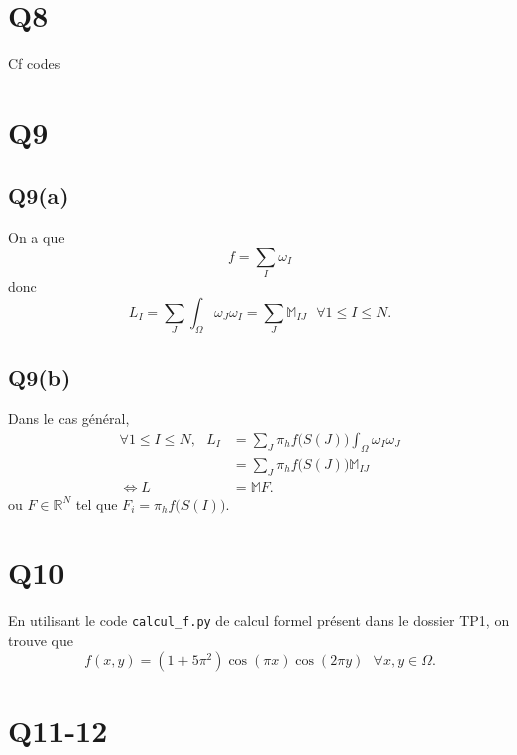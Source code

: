\documentclass[11pt]{article}
\newcommand{\R}{\mathbb{R}}
\newcommand{\M}{\mathbb{M}}
\newcommand{\ms}{~~~}
\begin{document}
\section{Q8}

Cf codes

\section{Q9}
\subsection{Q9(a)}
On a que
\begin{equation}
  f = \sum_I \omega_I
\end{equation}
donc
\begin{equation}
  L_I = \sum_J \int_\Omega \omega_J \omega_I = \sum_J \M_{IJ} \ms \forall 1 \leq I \leq N. 
\end{equation}

\subsection{Q9(b)}

Dans le cas général,
\begin{align}
  \forall 1 \leq I \leq N, \ms L_I
  &= \sum_J \pi_h f\big(S(J)\big) \int_\Omega \omega_I \omega_J \\
  &= \sum_J \pi_h f\big(S(J)\big) \M_{IJ} \\
  \Leftrightarrow
  L &= \M F.
\end{align}
ou $F\in\R^{ N}$ tel que $F_i = \pi_h f\big(S(I)\big)$.

\section{Q10}

En utilisant le code \texttt{calcul\_f.py} de calcul formel présent dans le dossier TP1, on trouve que
\begin{equation}
  f(x,y) = (1+5\pi^2)\cos(\pi x)\cos(2\pi y) \ms \forall x,y\in\Omega.
\end{equation}

\section{Q11-12}
\end{document}
